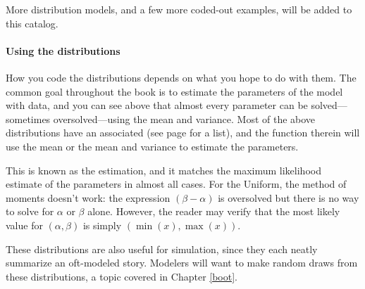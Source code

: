 
More distribution models, and a few more coded-out examples, will be added to this catalog.

\paragraph{Using the distributions} How you code the distributions
depends on what you hope to do with them. The common goal throughout the
book is to estimate the parameters of the model with data, and you can
see above that almost every parameter can be solved---sometimes
oversolved---using the mean and variance. Most of the above distributions
have an  associated (see page \pageref{modellist} for a
list), and the  function therein will use the mean or the
mean and variance to estimate the parameters.

This is known as the  estimation, and it
matches the maximum likelihood estimate of the parameters in almost all
cases. For the Uniform, the method of moments doesn't work: the
expression $(\beta - \alpha)$ is oversolved but there is no way to solve
for $\alpha$ or $\beta$ alone. However, the reader may verify that the
most likely value for $(\alpha, \beta)$ is simply $(\min(x), \max(x))$.

These distributions are also useful for simulation, since they each
neatly summarize an oft-modeled story. Modelers will want to make random
draws from these distributions, a topic covered in Chapter \ref{boot}.


